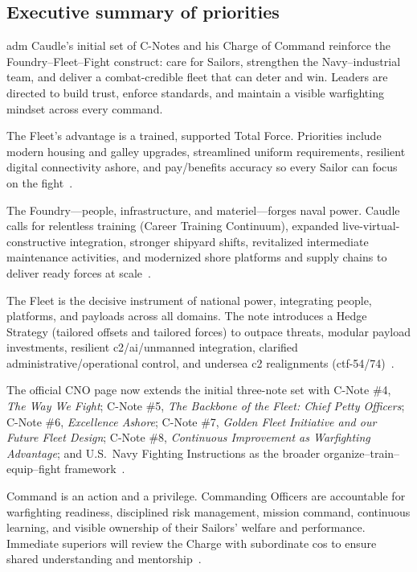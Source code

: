\documentclass[../main.tex]{subfiles}
\begin{document}
\subsection{Executive summary of priorities}
\begin{description}[style=nextline, labelsep=0.5em, font=\bfseries]
  \item[Overview.] \ac{adm} Caudle's initial set of C-Notes and his Charge of Command reinforce the Foundry--Fleet--Fight construct: care for Sailors, strengthen the Navy--industrial team, and deliver a combat-credible fleet that can deter and win. Leaders are directed to build trust, enforce standards, and maintain a visible warfighting mindset across every command.
  \item[C-Note \#1: Sailors First.] The Fleet's advantage is a trained, supported Total Force. Priorities include modern housing and galley upgrades, streamlined uniform requirements, resilient digital connectivity ashore, and pay/benefits accuracy so every Sailor can focus on the fight~\autocite{cno-cnote-1-2025}.
  \item[C-Note \#2: Foundry Always.] The Foundry---people, infrastructure, and materiel---forges naval power. Caudle calls for relentless training (Career Training Continuum), expanded live-virtual-constructive integration, stronger shipyard shifts, revitalized intermediate maintenance activities, and modernized shore platforms and supply chains to deliver ready forces at scale~\autocite{cno-cnote-2-2025}.
  \item[C-Note \#3: World Class Fleet.] The Fleet is the decisive instrument of national power, integrating people, platforms, and payloads across all domains. The note introduces a Hedge Strategy (tailored offsets and tailored forces) to outpace threats, modular payload investments, resilient \ac{c2}/\ac{ai}/unmanned integration, clarified administrative/operational control, and undersea \ac{c2} realignments (\ac{ctf}-54/74)~\autocite{cno-cnote-3-2025}.
  \item[Current series overlay.] The official CNO page now extends the initial three-note set with C-Note \#4, \emph{The Way We Fight}; C-Note \#5, \emph{The Backbone of the Fleet: Chief Petty Officers}; C-Note \#6, \emph{Excellence Ashore}; C-Note \#7, \emph{Golden Fleet Initiative and our Future Fleet Design}; C-Note \#8, \emph{Continuous Improvement as Warfighting Advantage}; and U.S.\ Navy Fighting Instructions as the broader organize--train--equip--fight framework~\autocite{cno-cnote-4-2026,cno-cnote-5-2026,cno-cnote-6-2026,cno-cnote-7-2026,cno-cnote-8-2026,cno-fighting-instructions-2026}.
  \item[Charge of Command.] Command is an action and a privilege. Commanding Officers are accountable for warfighting readiness, disciplined risk management, mission command, continuous learning, and visible ownership of their Sailors' welfare and performance. Immediate superiors will review the Charge with subordinate \acp{co} to ensure shared understanding and mentorship~\autocite{cno-charge-of-command-2025}.
\end{description}
\end{document}

